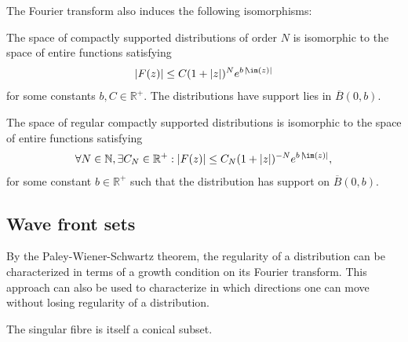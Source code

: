     The Fourier transform also induces the following isomorphisms:
    \begin{theorem}
        The space of compactly supported distributions of order $N$ is isomorphic to the space of entire functions satisfying
        \begin{gather}
            |F(z)|\leq C(1+|z|)^Ne^{b\,|\!\im(z)|}
        \end{gather}
        for some constants $b,C\in\mathbb{R}^+$. The distributions have support lies in $\overline{B}(0,b)$.

        The space of regular compactly supported distributions is isomorphic to the space of entire functions satisfying
        \begin{gather}
            \forall N\in\mathbb{N},\exists C_N\in\mathbb{R}^+:|F(z)|\leq C_N(1+|z|)^{-N}e^{b\,|\!\im(z)|},
        \end{gather}
        for some constant $b\in\mathbb{R}^+$ such that the distribution has support on $\overline{B}(0,b)$.
    \end{theorem}

\subsection{Wave front sets}

    By the Paley-Wiener-Schwartz theorem, the regularity of a distribution can be characterized in terms of a growth condition on its Fourier transform. This approach can also be used to characterize in which directions one can move without losing regularity of a distribution.

    \begin{property}
        The singular fibre is itself a conical subset.
    \end{property}

